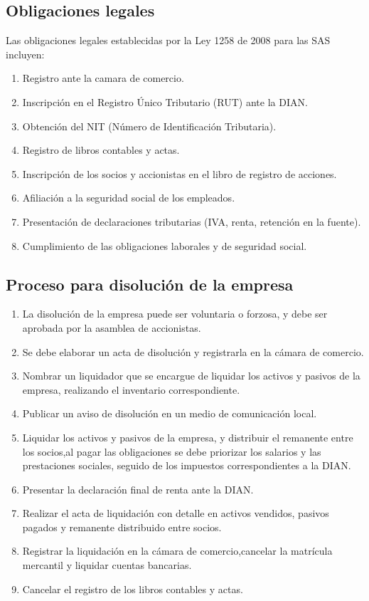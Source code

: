 \subsection*{Obligaciones legales}
Las obligaciones legales establecidas por la Ley 1258 de 2008 para las SAS incluyen:
\begin{enumerate}
    \item Registro ante la camara de comercio.
    \item Inscripción en el Registro Único Tributario (RUT) ante la DIAN.
    \item Obtención del NIT (Número de Identificación Tributaria).
    \item Registro de libros contables y actas.
    \item Inscripción de los socios y accionistas en el libro de registro de acciones.
    \item Afiliación a la seguridad social de los empleados.
    \item Presentación de declaraciones tributarias (IVA, renta, retención en la fuente).
    \item Cumplimiento de las obligaciones laborales y de seguridad social.
\end{enumerate}

\subsection*{Proceso para disolución de la empresa}
\begin{enumerate}

    \item La disolución de la empresa puede ser voluntaria o forzosa, y debe ser aprobada por la asamblea de accionistas.
    \item Se debe elaborar un acta de disolución y registrarla en la cámara de comercio.
    \item Nombrar un liquidador que se encargue de liquidar los activos y pasivos de la empresa, realizando el inventario correspondiente.
    \item Publicar un aviso de disolución en un medio de comunicación local.
    \item Liquidar los activos y pasivos de la empresa, y distribuir el remanente entre los socios,al pagar las obligaciones se debe priorizar los salarios y las prestaciones sociales, seguido de los impuestos correspondientes a la DIAN.
    \item Presentar la declaración final de renta ante la DIAN.
    \item Realizar el acta de liquidación con detalle en activos vendidos, pasivos pagados y remanente distribuido entre socios.
    \item Registrar la liquidación en la cámara de comercio,cancelar la matrícula mercantil y liquidar cuentas bancarias.
    \item Cancelar el registro de los libros contables y actas.
\end{enumerate}

